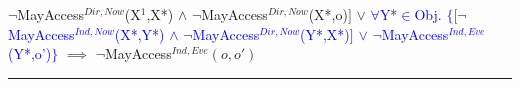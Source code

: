 \documentclass[a4paper,11pt, twoside,twocolumn]{article}
\newenvironment{logic}[1][]
{\begin{flushleft} \small }
{\end{flushleft}}
\newcommand{\loin}{$\in$}
\newcommand{\loforall}{$\forall$}
\newcommand{\loand}{$\land$}
\newcommand{\loor} {$\lor$}
\newcommand{\loimplies}{$\implies$}
\newcommand{\loneg}{$\boldsymbol \neg$}
\newcommand{\ablock} {\null\qquad}
\begin{document}
\begin{logic}
{\ablock \ablock \ablock \ablock \loneg MayAccess$^{Dir,Now}$(X$^1$,X*)\linebreak
}
\ablock \ablock \quad \loand \linebreak
\ablock \quad \loneg MayAccess$^{Dir,Now}$(X*,o)$ ]$\linebreak
\ablock \ablock \loor \linebreak
\textcolor{blue}{
\ablock \loforall Y*\loin Obj. $\{[$\loneg MayAccess$^{Ind,Now}$(X*,Y*)\linebreak
\ablock \ablock \ablock \ablock \quad \loand \linebreak
\ablock \ablock \ablock \quad\: \loneg MayAccess$^{Dir,Now}$(Y*,X*)$]$\linebreak
\ablock \ablock \ablock \quad \loor \linebreak
\ablock \ablock \ablock \quad \loneg MayAccess$^{Ind,Eve}$(Y*,o')$\}$
}\linebreak
\ablock \loimplies\linebreak
	\ablock\loneg MayAccess$^{Ind,Eve}(o,o')$\linebreak
\hrule
\end{logic}
\end{document}

